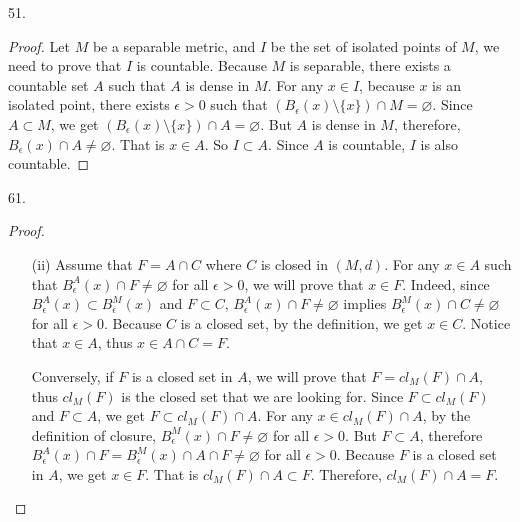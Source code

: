 \documentclass[12pt, a4paper]{article}
\theoremstyle{plain}
\begin{document}
51.
\begin{proof}
Let $M$ be a separable metric, and $I$ be the set of isolated points of $M$, we need to prove that $I$ is countable. Because $M$ is separable, there exists a countable set $A$ such that $A$ is dense in $M$. For any $x\in I$, because $x$ is an isolated point, there exists $\epsilon>0$ such that $(B_\epsilon(x)\setminus\{x\})\cap M=\varnothing$. Since $A\subset M$, we get $(B_\epsilon(x)\setminus\{x\})\cap A=\varnothing$. But $A$ is dense in $M$, therefore, $B_\epsilon(x)\cap A\neq \varnothing$. That is $x\in A$. So $I\subset A$. Since $A$ is countable, $I$ is also countable.
\end{proof}

61.
\begin{proof}
\hfill
\begin{enumerate}
\item[(ii)] Assume that $F=A\cap C$ where $C$ is closed in $(M,d)$. For any $x\in A$ such that $B_{\epsilon}^A(x)\cap F\neq \varnothing$ for all $\epsilon>0$, we will prove that $x\in F$. Indeed, since $B_\epsilon^A(x)\subset B_\epsilon^M(x)$ and $F\subset C$, $B_{\epsilon}^A(x)\cap F\neq \varnothing$ implies $B_\epsilon^M(x)\cap C\neq \varnothing$ for all $\epsilon>0$. Because $C$ is a closed set, by the definition, we get $x\in C$. Notice that $x\in A$, thus $x\in A\cap C=F$.

Conversely, if $F$ is a closed set in $A$, we will prove that $F=cl_M(F)\cap A$, thus $cl_M(F)$ is the closed set that we are looking for. Since $F\subset cl_M(F)$ and $F\subset A$, we get $F\subset cl_M(F)\cap A$. For any $x\in cl_M(F)\cap A$, by the definition of closure, $B_\epsilon^M(x)\cap F\neq \varnothing$ for all $\epsilon>0$. But $F\subset A$, therefore $B_\epsilon^A(x)\cap F=B_\epsilon^M(x)\cap A\cap F\neq \varnothing$ for all $\epsilon>0$. Because $F$ is a closed set in $A$, we get $x\in F$. That is $cl_M(F)\cap A\subset F$. Therefore, $cl_M(F)\cap A=F$.


\end{enumerate}
\end{proof}
\end{document}
